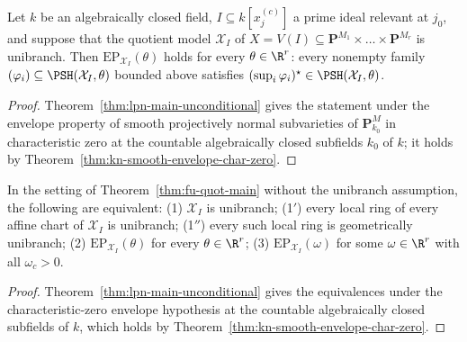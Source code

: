 \begin{theorem}
\label{thm:fu-quot-main}
\leanok
Let $k$ be an algebraically closed field, $I\subseteq k[x^{(c)}_j]$ a prime
ideal relevant at $j_0$, and suppose that the quotient model $\mathcal X_I$ of
$X=V(I)\subseteq\mathbf P^{M_1}\times\dots\times\mathbf P^{M_r}$ is unibranch.
Then $\mathrm{EP}_{\mathcal X_I}(\theta)$ holds for every $\theta\in\R^r$:
every nonempty family $(\varphi_i)\subseteq\PSH(\mathcal X_I,\theta)$ bounded
above satisfies $(\sup_i\varphi_i)^\star\in\PSH(\mathcal X_I,\theta)$.
\end{theorem}
\begin{proof}
Theorem~\ref{thm:lpn-main-unconditional} gives the statement under the
envelope property of smooth projectively normal subvarieties of
$\mathbf P^M_{k_0}$ in characteristic zero at the countable algebraically closed
subfields $k_0$ of $k$; it holds by Theorem~\ref{thm:kn-smooth-envelope-char-zero}.
\end{proof}

\begin{corollary}
\label{cor:fu-quot-characterization}
\leanok
In the setting of Theorem~\ref{thm:fu-quot-main} without the unibranch
assumption, the following are equivalent: (1) $\mathcal X_I$ is unibranch;
(1$'$) every local ring of every affine chart of $\mathcal X_I$ is unibranch;
(1$''$) every such local ring is geometrically unibranch; (2)
$\mathrm{EP}_{\mathcal X_I}(\theta)$ for every $\theta\in\R^r$; (3)
$\mathrm{EP}_{\mathcal X_I}(\omega)$ for some $\omega\in\R^r$ with all
$\omega_c>0$.
\end{corollary}
\begin{proof}
Theorem~\ref{thm:lpn-main-unconditional} gives the equivalences under the
characteristic-zero envelope hypothesis at the countable algebraically closed
subfields of $k$, which holds by Theorem~\ref{thm:kn-smooth-envelope-char-zero}.
\end{proof}

